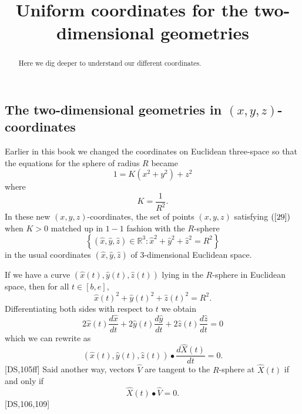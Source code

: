 \documentclass{ximera}
\title{Uniform coordinates for the two-dimensional geometries}
\begin{document}
\begin{abstract}
Here we dig deeper to understand our different coordinates.
\end{abstract}
\maketitle



\subsection*{The two-dimensional geometries in $\left(x,y,z\right)
$-coordinates}


Earlier in this book we changed the coordinates on Euclidean
three-space so that the equations for the sphere of radius $R$ became%
\begin{equation}
1=K\left(  x^{2}+y^{2}\right)  +z^{2} \label{29}%
\end{equation}
where%
\[
K=\frac{1}{R^{2}}.
\]
In these new $\left(  x,y,z\right)  $-coordinates, the set of points $\left(
x,y,z\right)  $ satisfying $\left(  \ref{29}\right)  $ when $K>0$ matched up
in $1-1$ fashion with the $R$-sphere%
\[
\left\{  \left(  \hat{x},\hat{y},\hat{z}\right)  \in\mathbb{R}^{3}:\hat{x}%
^{2}+\hat{y}^{2}+\hat{z}^{2}=R^{2}\right\}
\]
in the usual coordinates $\left(  \hat{x},\hat{y},\hat{z}\right)  $ of
$3$-dimensional Euclidean space.

If we have a curve $\left(  \hat{x}\left(  t\right)  ,\hat{y}\left(  t\right)
,\hat{z}\left(  t\right)  \right)  $ lying in the $R$-sphere in Euclidean
space, then for all $t\in\left[  b,e\right]  $,%
\[
\hat{x}\left(  t\right)  ^{2}+\hat{y}\left(  t\right)  ^{2}+\hat{z}\left(
t\right)  ^{2}=R^{2}.
\]
Differentiating both sides with respect to $t$ we obtain%
\[
2\hat{x}\left(  t\right)  \frac{d\hat{x}}{dt}+2\hat{y}\left(  t\right)
\frac{d\hat{y}}{dt}+2\hat{z}\left(  t\right)  \frac{d\hat{z}}{dt}=0
\]
which we can rewrite as%
\[
\left(  \hat{x}\left(  t\right)  ,\hat{y}\left(  t\right)  ,\hat{z}\left(
t\right)  \right)  \bullet\frac{d\hat{X}\left(  t\right)  }{dt}=0.
\]
[DS,105ff] Said another way, vectors $\hat{V}$ are tangent to the $R$-sphere
at $\hat{X}\left(  t\right)  $ if and only if%
\[
\hat{X}\left(  t\right)  \bullet\hat{V}=0.
\]
[DS,106,109]
\end{document}
